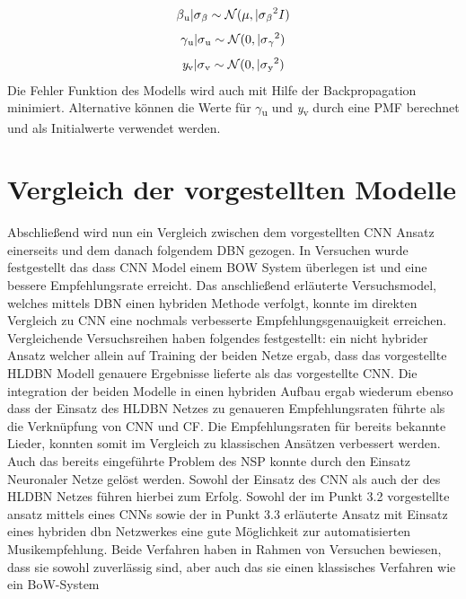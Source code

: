 \documentclass[twosided,a4,10pt]{article}
\begin{document}
\begin{multicols}{2}
\begin{equation*}
		\centering
		\beta\textsubscript{u}|\sigma\textsubscript{$\beta$}\sim\mathcal{N}(\mu,|\sigma\textsubscript{$\beta$}\textsuperscript{2}I)
		\end{equation*}
		\begin{equation*}
		\centering
		\gamma\textsubscript{u}|\sigma\textsubscript{u}\sim\mathcal{N}(0,|\sigma\textsubscript{$\gamma$}\textsuperscript{2})
		\end{equation*}
		\begin{equation*}
		\centering
		\textit{y}\textsubscript{v}|\sigma\textsubscript{v}\sim\mathcal{N}(0,|\sigma\textsubscript{y}\textsuperscript{2})
		\end{equation*}\newline
		Die Fehler Funktion des Modells wird auch mit Hilfe der Backpropagation minimiert. Alternative können  die Werte für $\gamma$\textsubscript{u} und \textit{y}\textsubscript{v} durch eine PMF berechnet und als Initialwerte verwendet werden.
		\section{Vergleich der vorgestellten Modelle}
		Abschließend wird nun ein Vergleich zwischen dem vorgestellten CNN Ansatz einerseits und dem danach folgendem DBN gezogen. In Versuchen \cite{oord} wurde festgestellt das dass CNN Model einem BOW System überlegen ist und eine bessere Empfehlungsrate erreicht. Das anschließend erläuterte  Versuchsmodel, welches mittels DBN einen hybriden Methode verfolgt, konnte im direkten Vergleich zu CNN eine nochmals verbesserte Empfehlungsgenauigkeit erreichen. Vergleichende Versuchsreihen \cite{wang} haben folgendes festgestellt: ein nicht hybrider Ansatz welcher allein auf Training der beiden Netze ergab, dass das vorgestellte HLDBN Modell genauere Ergebnisse lieferte als das vorgestellte CNN. Die integration der beiden Modelle in einen hybriden Aufbau ergab wiederum ebenso dass der Einsatz des HLDBN Netzes zu genaueren Empfehlungsraten führte als die Verknüpfung von CNN und CF. Die Empfehlungsraten für bereits bekannte Lieder, konnten somit im Vergleich zu klassischen Ansätzen verbessert werden. Auch das bereits eingeführte Problem des NSP konnte durch den Einsatz Neuronaler Netze gelöst werden.  Sowohl der Einsatz des CNN als auch der des HLDBN Netzes führen hierbei zum Erfolg.
		Sowohl der im Punkt 3.2 vorgestellte ansatz mittels eines CNNs sowie der in Punkt 3.3 erläuterte Ansatz mit Einsatz eines hybriden dbn Netzwerkes eine gute Möglichkeit zur automatisierten Musikempfehlung. Beide Verfahren haben in Rahmen von Versuchen bewiesen, dass sie sowohl zuverlässig sind, aber auch das sie einen klassisches Verfahren wie ein BoW-System 
		
		
	\end{multicols}
\end{document}
